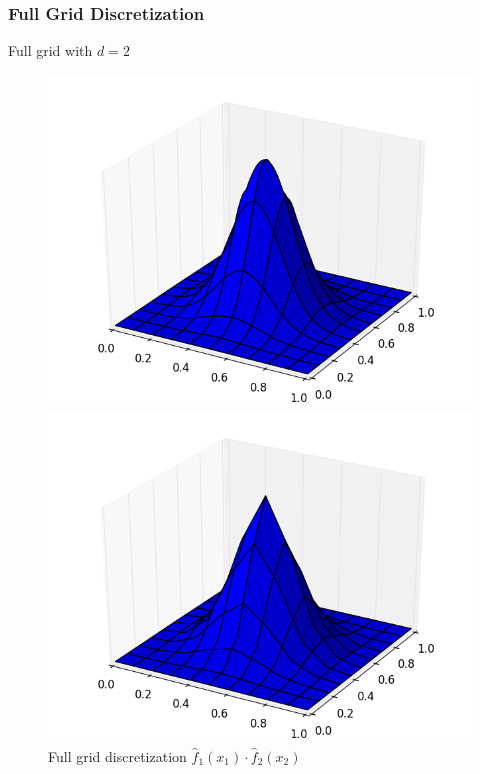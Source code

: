 \begin{frame}
  \frametitle{Full Grid Discretization}
  \topline
  \vspace{-10px}
  \begin{block}{Full grid with $d = 2$}

    \begin{figure}[!htb]
      \includegraphics[width=\linewidth]{images/2dgrid_1.png}
      \vspace{-12px}
      \caption{$f(x) = \mathcal{N}(\vec{x})$}
      \endminipage
      \includegraphics[width=\linewidth]{images/2dgrid_2.png}
      \vspace{-12px}
      \caption{Full grid discretization $\hat{f}_1(x_1) \cdot \hat{f}_2(x_2)$}
      \endminipage
    \end{figure}
  \end{block}
\end{frame}

